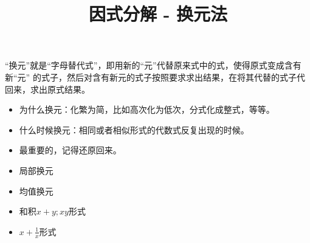\documentclass[windows,csize4]{BHCexam}
\title{因式分解 - 换元法}
\begin{document}
\maketitle

\begin{groups}
    “换元”就是“字母替代式”，即用新的“元”代替原来式中的式，使得原式变成含有新“元”
    的式子，然后对含有新元的式子按照要求求出结果，在将其代替的式子代回来，求出原式结果。
    \begin{itemize}
        \item 为什么换元：化繁为简，比如高次化为低次，分式化成整式，等等。
        \item 什么时候换元：相同或者相似形式的代数式反复出现的时候。
        \item 最重要的，记得还原回来。
    \end{itemize}

    \begin{itemize}
        \item 局部换元
        \item 均值换元
        \item 和积$x+y;xy$形式
        \item $x+\frac{1}{x}$形式
    \end{itemize}


\end{groups}
\end{document}
